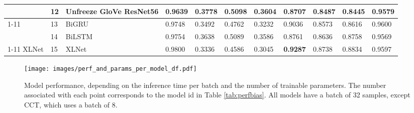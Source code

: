 \documentclass[a4paper,english]{rnti}
\begin{document}
\begin{table*}[htb]
{\begin{tabular}{lllllllllll}
 & 12 & Unfreeze GloVe ResNet56 & {\cellcolor[HTML]{509AC6}} \color[HTML]{F1F1F1} 0.9639 & {\cellcolor[HTML]{1E80B8}} \color[HTML]{F1F1F1} 0.3778 & {\cellcolor[HTML]{358FC0}} \color[HTML]{F1F1F1} 0.5098 & {\cellcolor[HTML]{1C7FB8}} \color[HTML]{F1F1F1} 0.3604 & {\cellcolor[HTML]{CDD0E5}} \color[HTML]{000000} 0.8707 & {\cellcolor[HTML]{7EADD1}} \color[HTML]{F1F1F1} 0.8487 & {\cellcolor[HTML]{75A9CF}} \color[HTML]{F1F1F1} 0.8445 & {\cellcolor[HTML]{B4C4DF}} \color[HTML]{000000} 0.9579 \\
\cline{1-11} 
\multirow[c]{2}{*}{RNN} & 13 & BiGRU & {\cellcolor[HTML]{D7D6E9}} \color[HTML]{000000} 0.9748 & {\cellcolor[HTML]{045687}} \color[HTML]{F1F1F1} 0.3492 & {\cellcolor[HTML]{045A8D}} \color[HTML]{F1F1F1} 0.4762 & {\cellcolor[HTML]{045483}} \color[HTML]{F1F1F1} 0.3232 & {\cellcolor[HTML]{EEE9F3}} \color[HTML]{000000} 0.9036 & {\cellcolor[HTML]{AFC1DD}} \color[HTML]{000000} 0.8573 & {\cellcolor[HTML]{B0C2DE}} \color[HTML]{000000} 0.8616 & {\cellcolor[HTML]{D6D6E9}} \color[HTML]{000000} 0.9600 \\

 & 14 & BiLSTM & {\cellcolor[HTML]{DAD9EA}} \color[HTML]{000000} 0.9754 & {\cellcolor[HTML]{0569A5}} \color[HTML]{F1F1F1} 0.3638 & {\cellcolor[HTML]{328DBF}} \color[HTML]{F1F1F1} 0.5089 & {\cellcolor[HTML]{197DB7}} \color[HTML]{F1F1F1} 0.3586 & {\cellcolor[HTML]{D3D4E7}} \color[HTML]{000000} 0.8761 & {\cellcolor[HTML]{CED0E6}} \color[HTML]{000000} 0.8636 & {\cellcolor[HTML]{D7D6E9}} \color[HTML]{000000} 0.8758 & {\cellcolor[HTML]{A4BCDA}} \color[HTML]{000000} 0.9569 \\
\cline{1-11} 
XLNet & 15 & XLNet & {\cellcolor[HTML]{F7F0F7}} \color[HTML]{000000} 0.9800 & {\cellcolor[HTML]{023858}} \color[HTML]{F1F1F1} 0.3336 & {\cellcolor[HTML]{023858}} \color[HTML]{F1F1F1} 0.4586 & {\cellcolor[HTML]{023858}} \color[HTML]{F1F1F1} 0.3045 & {\cellcolor[HTML]{FFF7FB}} \color[HTML]{000000} \bfseries 0.9287 & {\cellcolor[HTML]{F0EAF4}} \color[HTML]{000000} 0.8738 & {\cellcolor[HTML]{E6E2EF}} \color[HTML]{000000} 0.8834 & {\cellcolor[HTML]{D2D3E7}} \color[HTML]{000000} 0.9597 \\
\bottomrule
\end{tabular}
}
\caption{Model performance results.}
\label{tab:perfbias}
\end{table*}

\begin{figure}[ht]
  \centering
  \texttt{[image: images/perf\_and\_params\_per\_model\_df.pdf]}
  \caption{Model performance, depending on the inference time per batch and the number of trainable parameters. The number associated with each point corresponds to the model id in Table \ref{tab:perfbias}. All models have a batch of 32 samples, except CCT, which uses a batch of 8.}
  
  \label{graph:perftime}
\end{figure}
\end{document}
